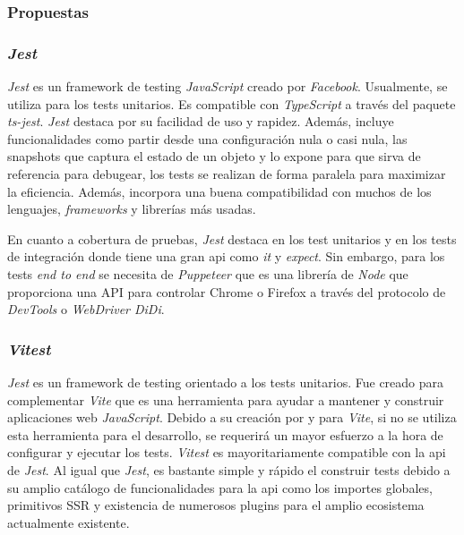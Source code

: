 \subsubsection{Propuestas}

\subsubsection{\textit{Jest}}

\textit{Jest} es un framework de testing \textit{JavaScript} creado por \textit{Facebook}. Usualmente, se utiliza para los tests unitarios. Es compatible con \textit{TypeScript} a través del paquete \textit{ts-jest}. \textit{Jest} destaca por su facilidad de uso y rapidez. Además, incluye funcionalidades como partir desde una configuración nula o casi nula, las snapshots que captura el estado de un objeto y lo expone para que sirva de referencia para debugear, los tests se realizan de forma paralela para maximizar la eficiencia. Además, incorpora una buena compatibilidad con muchos de los lenguajes, \textit{frameworks} y librerías más usadas.

En cuanto a cobertura de pruebas, \textit{Jest} destaca en los test unitarios y en los tests de integración donde tiene una gran api como \textit{it} y \textit{expect}. Sin embargo, para los tests \textit{end to end} se necesita de \textit{Puppeteer} que es una librería de \textit{Node} que proporciona una API para controlar Chrome o Firefox a través del protocolo de \textit{DevTools} o \textit{WebDriver DiDi}.

\subsubsection{\textit{Vitest}}

\textit{Jest} es un framework de testing orientado a los tests unitarios. Fue creado para complementar \textit{Vite} que es una herramienta para ayudar a mantener y construir aplicaciones web \textit{JavaScript}. Debido a su creación por y para \textit{Vite}, si no se utiliza esta herramienta para el desarrollo, se requerirá un mayor esfuerzo a la hora de configurar y ejecutar los tests. \textit{Vitest} es mayoritariamente compatible con la api de \textit{Jest}. Al igual que \textit{Jest}, es bastante simple y rápido el construir tests debido a su amplio catálogo de funcionalidades para la api como los importes globales, primitivos SSR y existencia de numerosos plugins para el amplio ecosistema actualmente existente.

